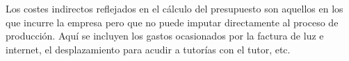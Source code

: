 Los costes indirectos reflejados en el cálculo del presupuesto son aquellos en los que incurre la empresa pero que no puede imputar directamente al proceso de producción. Aquí se incluyen los gastos ocasionados por la factura de luz e internet, el desplazamiento para acudir a tutorías con el tutor, etc.